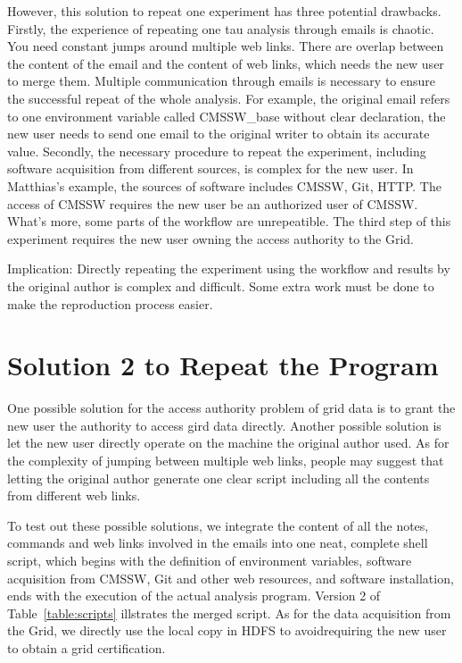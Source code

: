 \documentclass{acm_proc_article-sp}
\begin{document}
However, this solution to repeat one experiment has three potential drawbacks. Firstly, the experience of repeating one tau analysis through emails is chaotic. You need constant jumps around multiple web links. There are overlap between the content of the email and the content of web links, which needs the new user to merge them. Multiple communication through emails is necessary to ensure the successful repeat of the whole analysis. For example, the original email refers to one environment variable called CMSSW\_base without clear declaration, the new user needs to send one email to the original writer to obtain its accurate value. Secondly, the necessary procedure to repeat the experiment, including software acquisition from different sources, is complex for the new user. In Matthias's example, the sources of software includes CMSSW, Git, HTTP. The access of CMSSW requires the new user be an authorized user of CMSSW. What's more, some parts of the workflow are unrepeatible. The third step of this experiment requires the new user owning the access authority to the Grid. 

Implication: Directly repeating the experiment using the workflow and results by the original author is complex and difficult. Some extra work must be done to make the reproduction process easier.

\section{Solution 2 to Repeat the Program}
One possible solution for the access authority problem of grid data is to grant the new user the authority to access gird data directly. Another possible solution is let the new user directly operate on the machine the original author used. As for the complexity of jumping between multiple web links, people may suggest that letting the original author generate one clear script including all the contents from different web links.

To test out these possible solutions, we integrate the content of all the notes, commands and web links involved in the emails into one neat, complete shell script, which begins with the definition of environment variables, software acquisition from CMSSW, Git and other web resources, and software installation, ends with the execution of the actual analysis program. Version 2 of Table~\ref{table:scripts} illstrates the merged script. As for the data acquisition from the Grid, we directly use the local copy in HDFS to avoidrequiring the new user to obtain a grid certification.
\end{document}
